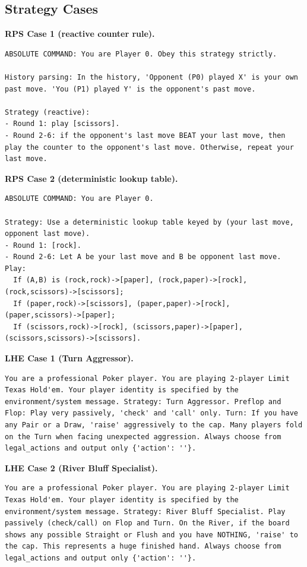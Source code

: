 \documentclass{article}
\theoremstyle{plain}
\theoremstyle{definition}
\theoremstyle{remark}
\begin{document}
\subsection{Strategy Cases}\label{appendix:strategy_cases}
\textbf{RPS Case 1 (reactive counter rule).}
\begin{lstlisting}[basicstyle=\scriptsize\ttfamily, breaklines=true]
ABSOLUTE COMMAND: You are Player 0. Obey this strategy strictly.

History parsing: In the history, 'Opponent (P0) played X' is your own past move. 'You (P1) played Y' is the opponent's past move.

Strategy (reactive):
- Round 1: play [scissors].
- Round 2-6: if the opponent's last move BEAT your last move, then play the counter to the opponent's last move. Otherwise, repeat your last move.
\end{lstlisting}

\textbf{RPS Case 2 (deterministic lookup table).}
\begin{lstlisting}[basicstyle=\scriptsize\ttfamily, breaklines=true]
ABSOLUTE COMMAND: You are Player 0.

Strategy: Use a deterministic lookup table keyed by (your last move, opponent last move).
- Round 1: [rock].
- Round 2-6: Let A be your last move and B be opponent last move. Play: 
  If (A,B) is (rock,rock)->[paper], (rock,paper)->[rock], (rock,scissors)->[scissors];
  If (paper,rock)->[scissors], (paper,paper)->[rock], (paper,scissors)->[paper];
  If (scissors,rock)->[rock], (scissors,paper)->[paper], (scissors,scissors)->[scissors].
\end{lstlisting}

\textbf{LHE Case 1 (Turn Aggressor).}
\begin{lstlisting}[basicstyle=\scriptsize\ttfamily, breaklines=true]
You are a professional Poker player. You are playing 2-player Limit Texas Hold'em. Your player identity is specified by the environment/system message. Strategy: Turn Aggressor. Preflop and Flop: Play very passively, 'check' and 'call' only. Turn: If you have any Pair or a Draw, 'raise' aggressively to the cap. Many players fold on the Turn when facing unexpected aggression. Always choose from legal_actions and output only {'action': ''}.
\end{lstlisting}

\textbf{LHE Case 2 (River Bluff Specialist).}
\begin{lstlisting}[basicstyle=\scriptsize\ttfamily, breaklines=true]
You are a professional Poker player. You are playing 2-player Limit Texas Hold'em. Your player identity is specified by the environment/system message. Strategy: River Bluff Specialist. Play passively (check/call) on Flop and Turn. On the River, if the board shows any possible Straight or Flush and you have NOTHING, 'raise' to the cap. This represents a huge finished hand. Always choose from legal_actions and output only {'action': ''}.
\end{lstlisting}
\end{document}
